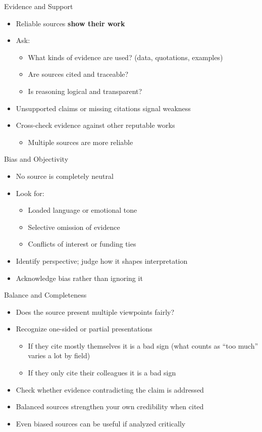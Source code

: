 \documentclass[aspectratio=169]{beamer}
\begin{document}
\begin{frame}{Evidence and Support}
\begin{itemize}
  \item Reliable sources \textbf{show their work}
  \item Ask:
    \begin{itemize}
      \item What kinds of evidence are used? (data, quotations, examples)
      \item Are sources cited and traceable?
      \item Is reasoning logical and transparent?
    \end{itemize}
  \item Unsupported claims or missing citations signal weakness
  \item Cross-check evidence against other reputable works
    \begin{itemize}
    \item Multiple sources are more reliable
    \end{itemize}
\end{itemize}
\end{frame}

\begin{frame}{Bias and Objectivity}
\begin{itemize}
  \item No source is completely neutral
  \item Look for:
    \begin{itemize}
      \item Loaded language or emotional tone
      \item Selective omission of evidence
      \item Conflicts of interest or funding ties
    \end{itemize}
  \item Identify perspective; judge how it shapes interpretation
  \item Acknowledge bias rather than ignoring it
\end{itemize}
\end{frame}

\begin{frame}{Balance and Completeness}
\begin{itemize}
  \item Does the source present multiple viewpoints fairly?
  \item Recognize one-sided or partial presentations
    \begin{itemize}
    \item If they cite mostly themselves it is a bad sign (what counts as
      ``too much'' varies a lot by field)
    \item If they only cite their colleagues it is a bad sign
    \end{itemize}
  \item Check whether evidence contradicting the claim is addressed
  \item Balanced sources strengthen your own credibility when cited
  \item Even biased sources can be useful if analyzed critically
\end{itemize}
\end{frame}
\end{document}
